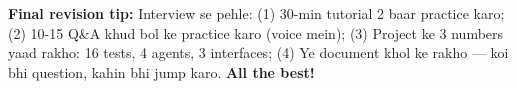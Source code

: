 \begin{memorybox}
\textbf{Final revision tip:} Interview se pehle: (1) 30-min tutorial 2 baar practice karo; (2) 10-15 Q\&A khud bol ke practice karo (voice mein); (3) Project ke 3 numbers yaad rakho: 16 tests, 4 agents, 3 interfaces; (4) Ye document khol ke rakho --- koi bhi question, kahin bhi jump karo. \textbf{All the best!}
\end{memorybox}
